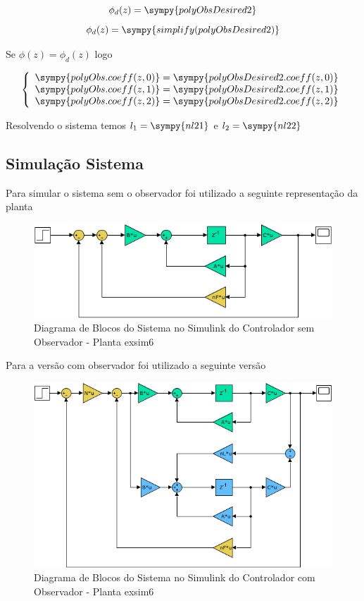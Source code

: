 \documentclass[a4paper,11pt]{article}
\begin{document}
$$\phi_d(z) = \sympy{polyObsDesired2}$$
$$\phi_d(z) = \sympy{simplify(polyObsDesired2)}$$

Se $\phi(z) = \phi_d(z)$ logo

$$
\left\{
    \begin{array}{l}
        \sympy{polyObs.coeff(z,0)} = \sympy{polyObsDesired2.coeff(z,0)}\\
        \sympy{polyObs.coeff(z,1)} = \sympy{polyObsDesired2.coeff(z,1)}\\
        \sympy{polyObs.coeff(z,2)} = \sympy{polyObsDesired2.coeff(z,2)}\\
    \end{array}
\right.
$$

Resolvendo o sistema temos $l_1 = \sympy{nl21} $ e $l_2 = \sympy{nl22}$

\subsection{Simulação Sistema}

Para simular o sistema sem o observador foi utilizado a seguinte representação da planta

\begin{figure}[H]
    \centering
    \includegraphics[width=0.9\linewidth]{img/exsim6_ss_model.png}
    \caption{Diagrama de Blocos do Sistema no Simulink do Controlador sem Observador - Planta exsim6}
\end{figure}

Para a versão com observador foi utilizado a seguinte versão

\begin{figure}[H]
    \centering
    \includegraphics[width=0.9\linewidth]{img/exsim6_ss_observer_model.png}
    \caption{Diagrama de Blocos do Sistema no Simulink do Controlador com Observador - Planta exsim6}
\end{figure}
\end{document}
